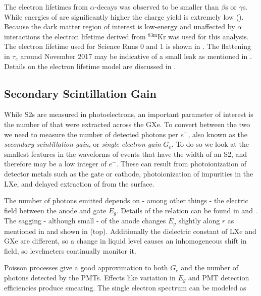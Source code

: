 The electron lifetimes from $\alpha$-decays was observed to be smaller than $\beta$s or $\gamma$s.  While energies of \alphadecays are
significantly higher the charge yield is extremely low ().  Because the dark matter region of
interest is low-energy and unaffected by $\alpha$ interactions the electron lifetime derived from $\mathrm{^{83m}Kr}$ was used for this
analysis.  The
electron lifetime used for Science Runs 0 and 1 is shown in .  The flattening in $\tau_{e}$
around November 2017 may be indicative of a small leak as mentioned in .  Details on the
electron lifetime model are discussed in .



\subsection{Secondary Scintillation Gain}
\label{subsec:det_char_single_electron_gain}
While S2s are measured in photoelectrons, an important parameter of
interest is the number of \electron that were extracted across the GXe.  To convert between the two we need to measure the number of
detected photons per $e^-$, also known as the \textit{secondary scintillation gain}, or \textit{single electron gain} $G_e$.  To do so we
look at the
smallest features in the waveforms of events that have the width of an S2, and therefore may be a low integer of $e^-$.  These can
result
from photoionization of detector metals such as the gate or cathode, photoionization of impurities in the LXe, and delayed extraction
of \electron from the surface.

The number of photons emitted depends on - among other things - the electric field between the anode and gate $E_g$.  Details of the
relation can be found in  and .  The sagging - although small - of the
anode changes $E_g$ slightly along $r$ as mentioned in  and shown in
 (top).  Additionally the dielectric constant of LXe and GXe are different, so a change in liquid level
causes an inhomogeneous shift in field, so levelmeters continually monitor it.

Poisson processes give a good approximation to both $G_e$ and the number of photons detected by the PMTs.  Effects like variation in $E_g$
and PMT detection efficiencies produce smearing.  The single electron spectrum can be modeled as

